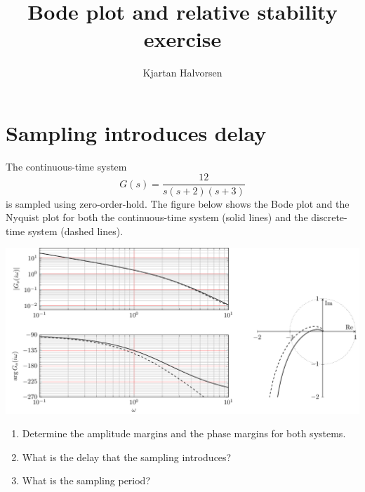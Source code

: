 \documentclass[letterpaper]{scrartcl}
\author{Kjartan Halvorsen}
\date{}
\title{Bode plot and relative stability exercise}
\begin{document}
\maketitle

\section{Sampling introduces delay}
\label{sec-1}
The continuous-time system 
\[ G(s) = \frac{12}{s(s+2)(s+3)} \]
is sampled using zero-order-hold. The figure below shows the Bode plot and the Nyquist plot for both the continuous-time system (solid lines) and the discrete-time system (dashed lines). 
\begin{center}
\includegraphics[width=\linewidth]{bode-loop-gain-sol}
\end{center}

\begin{enumerate}
\item Determine the amplitude margins and the phase margins for both systems.
\item What is the delay that the sampling introduces?
\item What is the sampling period?
\end{enumerate}
\end{document}

